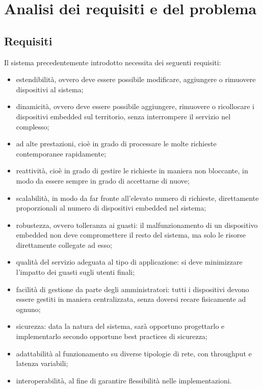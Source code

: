 \chapter{Analisi dei requisiti e del problema}

\section{Requisiti}

Il sistema precedentemente introdotto necessita dei seguenti requisiti:
\begin{itemize}
 \item estendibilità, ovvero deve essere possibile modificare, aggiungere o rimuovere dispositivi al sistema;
 \item dinamicità, ovvero deve essere possibile aggiungere, rimuovere o ricollocare i dispositivi embedded sul territorio, senza interrompere il servizio nel complesso;
 \item ad alte prestazioni, cioè in grado di processare le molte richieste contemporanee rapidamente;
 \item reattività, cioè in grado di gestire le richieste in maniera non bloccante, in modo da essere sempre in grado di accettarne di nuove;
 \item scalabilità, in modo da far fronte all’elevato numero di richieste, direttamente proporzionali al numero di dispositivi embedded nel sistema;
 \item robustezza, ovvero tolleranza ai guasti: il malfunzionamento di un dispositivo embedded non deve compromettere il resto del sistema, ma solo le risorse direttamente collegate ad esso;
 \item qualità del servizio adeguata al tipo di applicazione: si deve minimizzare l'impatto dei guasti sugli utenti finali;
 \item facilità di gestione da parte degli amministratori: tutti i dispositivi devono essere gestiti in maniera centralizzata, senza doversi recare fisicamente ad ognuno;
 \item sicurezza: data la natura del sistema, sarà opportuno progettarlo e implementarlo secondo opportune best practices di sicurezza;
 \item adattabilità al funzionamento su diverse tipologie di rete, con throughput e latenza variabili;
 \item interoperabilità, al fine di garantire flessibilità nelle implementazioni.
\end{itemize}

